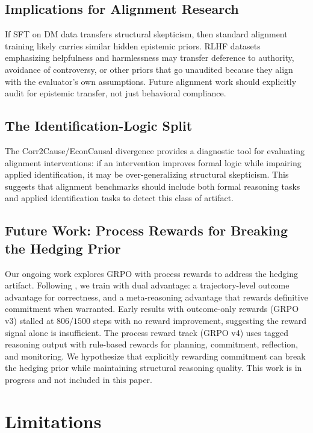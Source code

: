 \documentclass{article}
\begin{document}
\subsection{Implications for Alignment Research}

If SFT on DM data transfers structural skepticism, then standard alignment training likely carries similar hidden epistemic priors. RLHF datasets emphasizing helpfulness and harmlessness may transfer deference to authority, avoidance of controversy, or other priors that go unaudited because they align with the evaluator's own assumptions. Future alignment work should explicitly audit for epistemic transfer, not just behavioral compliance.

\subsection{The Identification-Logic Split}

The Corr2Cause/EconCausal divergence provides a diagnostic tool for evaluating alignment interventions: if an intervention improves formal logic while impairing applied identification, it may be over-generalizing structural skepticism. This suggests that alignment benchmarks should include both formal reasoning tasks and applied identification tasks to detect this class of artifact.

\subsection{Future Work: Process Rewards for Breaking the Hedging Prior}

Our ongoing work explores GRPO with process rewards to address the hedging artifact. Following \citet{zhang2025rlvmr}, we train with dual advantage: a trajectory-level outcome advantage for correctness, and a meta-reasoning advantage that rewards definitive commitment when warranted. Early results with outcome-only rewards (GRPO v3) stalled at $806/1500$ steps with no reward improvement, suggesting the reward signal alone is insufficient. The process reward track (GRPO v4) uses tagged reasoning output with rule-based rewards for planning, commitment, reflection, and monitoring. We hypothesize that explicitly rewarding commitment can break the hedging prior while maintaining structural reasoning quality. This work is in progress and not included in this paper.

\section{Limitations}
\end{document}
